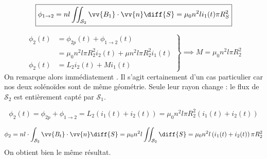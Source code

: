 
\begin{equation}
  \boxed{\phi_{1 \to 2} = nl \iint_{\mathcal{S}_2} \vv{B_1} \cdot \vv{n} \diff{S} = \mu_0 n^2 l i_1 (t) \pi R_S^2}
\end{equation}


\begin{equation}
  \left.
  \begin{split}
    \phi_2 (t)  &= \phi_{2p} (t) + \phi_{1 \to 2} (t)\\
                &= \mu_0 n^2 l \pi R_2^2 i_2(t) + \mu n^2 l \pi R_2^2 i_1 (t)\\
    \phi_2 (t)  &= L_2 i_2 (t) + M i_1 (t)
  \end{split}
  \right\rbrace
  \implies
  \boxed{M = \mu_0 n^2 l \pi R_2^2}
\end{equation}
On remarque alors immédiatement . Il s'agit certainement d'un cas particulier car nos deux solénoïdes sont de même géométrie. Seule leur rayon change : le flux de $\mathcal{S}_2$ est entièrement capté par $\mathcal{S}_1$.


\begin{equation}
  \boxed{\phi_2 (t) = \phi_{2p} + \phi_{1 \to 2} = L_2 \left( i_1(t) + i_2 (t) \right) = \mu_0 n^2 l \pi R_2^2 \left( i_1(t) + i_2(t) \right)}
\end{equation}


\begin{equation}
  \phi_2 = nl \cdot \int_{\mathcal{S}_2} \vv{B_t} \cdot \vv{n} \diff{S} = \mu_0 n^2 l \iint_{\mathcal{S}_2} \diff{S} = \mu_0 n^2 l \left( i_1(t) + i_2 (t) \right) \pi R_2^2
\end{equation}
On obtient bien le même résultat.


